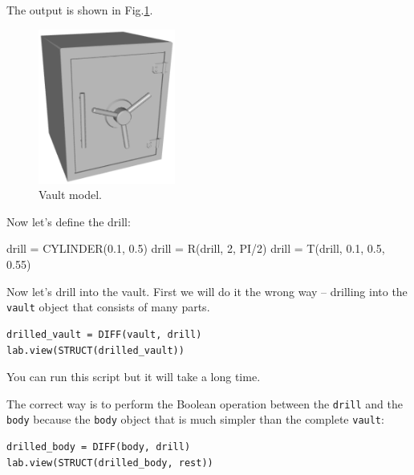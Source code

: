 \vspace{6mm}

\noindent
The output is shown in Fig.\ref{fig:vault}.

\begin{figure}[!ht]
\begin{center}
\includegraphics[width=0.4\textwidth]{img/vault.png}
\end{center}
\vspace{-4mm}
\caption{Vault model.}
\label{fig:vault}
\end{figure}
\noindent
Now let's define the drill: 
\begin{bbox}
drill = CYLINDER(0.1, 0.5)
drill = R(drill, 2, PI/2)
drill = T(drill, 0.1, 0.5, 0.55)
\end{bbox}
\index{}Now let's drill into the vault. First we will do it 
the wrong way -- drilling into the {\tt vault} object
that consists of many parts. 

\begin{bbox}
\begin{verbatim}
drilled_vault = DIFF(vault, drill)
lab.view(STRUCT(drilled_vault))
\end{verbatim}
\end{bbox}
\vspace{6mm}

\noindent
You can run this script but it will take a long time.

The correct way is to perform the Boolean 
operation between the {\tt drill} and the {\tt body} 
because the {\tt body} object that is much simpler 
than the complete {\tt vault}: 

\begin{bbox}
\begin{verbatim}
drilled_body = DIFF(body, drill)
lab.view(STRUCT(drilled_body, rest))
\end{verbatim}
\end{bbox}
\vspace{6mm}

